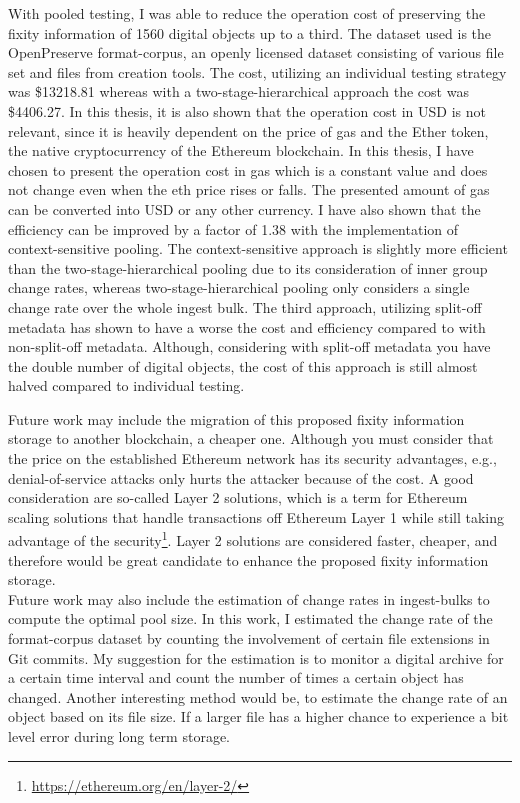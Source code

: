 With pooled testing, I was able to reduce the operation cost of preserving the fixity information of 1560 digital objects up to a third. The dataset used is the OpenPreserve format-corpus, an openly licensed dataset consisting of various file set and files from creation tools. The cost, utilizing an individual testing strategy was \$13218.81 whereas with a two-stage-hierarchical approach the cost was \$4406.27. In this thesis, it is also shown that the operation cost in USD is not relevant, since it is heavily dependent on the price of gas and the Ether token, the native cryptocurrency of the Ethereum blockchain. In this thesis, I have chosen to present the operation cost in gas which is a constant value and does not change even when the \acrlong{eth} price rises or falls. The presented amount of gas can be converted into USD or any other currency. I have also shown that the efficiency can be improved by a factor of 1.38 with the implementation of context-sensitive pooling. The context-sensitive approach is slightly more efficient than the two-stage-hierarchical pooling due to its consideration of inner group change rates, whereas two-stage-hierarchical pooling only considers a single change rate over the whole ingest bulk.
The third approach, utilizing split-off metadata has shown to have a worse the cost and efficiency compared to with non-split-off metadata. Although, considering with split-off metadata you have the double number of digital objects, the cost of this approach is still almost halved compared to individual testing.

Future work may include the migration of this proposed fixity information storage to another blockchain, a cheaper one. Although you must consider that the price on the established Ethereum network has its security advantages, e.g., denial-of-service attacks only hurts the attacker because of the cost. A good consideration are so-called Layer 2 solutions, which is a term for Ethereum scaling solutions that handle transactions off Ethereum Layer 1 while still taking advantage of the security\footnote{\url{https://ethereum.org/en/layer-2/}}. Layer 2 solutions are considered faster, cheaper, and therefore would be great candidate to enhance the proposed fixity information storage.\\
Future work may also include the estimation of change rates in ingest-bulks to compute the optimal pool size. In this work, I estimated the change rate of the format-corpus dataset by counting the involvement of certain file extensions in Git commits. My suggestion for the estimation is to monitor a digital archive for a certain time interval and count the number of times a certain object has changed. Another interesting method would be, to estimate the change rate of an object based on its file size. If a larger file has a higher chance to experience a bit level error during long term storage.

